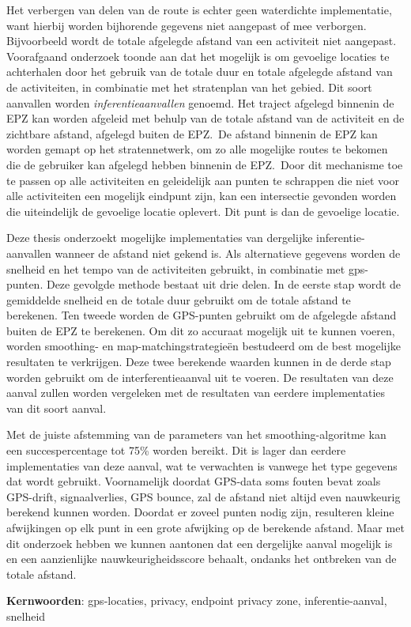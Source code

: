Het verbergen van delen van de route is echter geen waterdichte implementatie,
want hierbij worden bijhorende gegevens niet aangepast of mee verborgen.
Bijvoorbeeld wordt de totale afgelegde afstand van een activiteit niet
aangepast. Voorafgaand onderzoek toonde aan dat het mogelijk is om gevoelige
locaties te achterhalen door het gebruik van de totale duur en totale afgelegde
afstand van de activiteiten, in combinatie met het stratenplan van het gebied.
Dit soort aanvallen worden \textit{inferentieaanvallen} genoemd. Het traject
afgelegd binnenin de EPZ kan worden afgeleid met behulp van de totale afstand
van de activiteit en de zichtbare afstand, afgelegd buiten de EPZ.\ De afstand
binnenin de EPZ kan worden gemapt op het stratennetwerk, om zo alle mogelijke
routes te bekomen die de gebruiker kan afgelegd hebben binnenin de EPZ.\ Door
dit mechanisme toe te passen op alle activiteiten en geleidelijk aan punten te
schrappen die niet voor alle activiteiten een mogelijk eindpunt zijn, kan een
intersectie gevonden worden die uiteindelijk de gevoelige locatie oplevert. Dit
punt is dan de gevoelige locatie.

Deze thesis onderzoekt mogelijke implementaties van dergelijke
inferentie-aanvallen wanneer de afstand niet gekend is. Als alternatieve
gegevens worden de snelheid en het tempo van de activiteiten gebruikt, in combinatie met
gps-punten. Deze gevolgde methode bestaat uit drie delen. In de eerste stap
wordt de gemiddelde snelheid en de totale duur gebruikt om de totale afstand te
berekenen. Ten tweede worden de GPS-punten gebruikt om de afgelegde afstand
buiten de EPZ te berekenen. Om dit zo accuraat mogelijk uit te kunnen voeren,
worden smoothing- en map-matchingstrategieën bestudeerd om de best mogelijke
resultaten te verkrijgen. Deze twee berekende waarden kunnen in de derde stap
worden gebruikt om de interferentieaanval uit te voeren. De resultaten van deze
aanval zullen worden vergeleken met de resultaten van eerdere implementaties
van dit soort aanval.

Met de juiste afstemming van de parameters van het smoothing-algoritme kan een
succespercentage tot 75\% worden bereikt. Dit is lager dan eerdere
implementaties van deze aanval, wat te verwachten is vanwege het type gegevens
dat wordt gebruikt. Voornamelijk doordat GPS-data soms fouten bevat zoals
GPS-drift, signaalverlies, GPS bounce, zal de afstand niet altijd even
nauwkeurig berekend kunnen worden. Doordat er zoveel punten nodig zijn,
resulteren kleine afwijkingen op elk punt in een grote afwijking op de
berekende afstand. Maar met dit onderzoek hebben we kunnen aantonen dat een
dergelijke aanval mogelijk is en een aanzienlijke nauwkeurigheidsscore behaalt,
ondanks het ontbreken van de totale afstand.

\textbf{Kernwoorden}: gps-locaties, privacy, endpoint privacy zone,
inferentie-aanval, snelheid